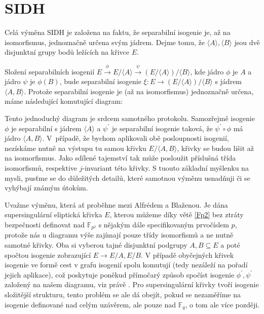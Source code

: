 \documentclass[12pt]{report}
\begin{document}
\section{SIDH}

Celá výměna SIDH je založena na faktu, že separabilní isogenie je, až na isomorfismus, jednoznačně určena svým jádrem. Dejme tomu, že $\langle A \rangle, \langle B \rangle$ jsou dvě disjunktní grupy bodů ležících na křivce $E$.

Složení separabilních isogenií $E \stackrel{\phi}{\longrightarrow} E/\langle A \rangle \stackrel{\psi}{\longrightarrow} (E / \langle A \rangle)/\langle B \rangle$, kde jádro $\phi$ je $A$ a jádro $\psi$ je $\phi (B)$, bude separabilní isogenie $\xi : E \longrightarrow (E / \langle A \rangle)/\langle B \rangle$ s jádrem $\langle A,B \rangle$. Protože separabilní isogenie je (až na isomorfismus) jednoznačně určena, máme následující komutující diagram:

\begin{figure}[h]
\begin{center} 
\end{center}
\end{figure}

Tento jednoduchý diagram je srdcem samotného protokolu. Samozřejmě isogenie $\phi$ je separabilní s jádrem $\langle A \rangle$ a $\psi^\prime$ je separabilní isogenie taková, že $\psi^\prime \circ \phi$ má jádro $\langle A,B \rangle$. V~případě, že bychom aplikovali obě posloupnosti isogenií, nezískáme nutně na výstupu tu samou křivku $E/\langle A,B \rangle$, křivky se budou lišit až na isomorfismus. Jako sdílené tajemství tak může posloužit příslušná třída isomorfismů, respektive $j$-invariant této křivky. S tuouto základní myšlenku na mysli, pusťme se do důležitých detailů, které samotnou výměnu usnadňuji či se vyhýbají známým útokům.

Uvažme výměnu, která ať proběhne mezi Alfrédem a Blaženou. Je dána supersingulární eliptická křivka $E$, kterou můžeme díky větě \ref{Fp2} bez ztráty bezpečnosti definovat nad $\mathbb{F}_{p^2}$ s nějakým dále specifikovaným prvočíslem $p$, protože nás u diagramu výše zajímají pouze třídy isomorfismů a ne nutně samotné křivky. Oba si vyberou tajné disjunktní podgrupy $A,B \subseteq E$ a poté spočtou isogenie zobrazující $E \longrightarrow E/A,E/B$. V případě obyčejných křivek isogenie ve formě cest v grafu isogenií spolu komutují (tedy nezáleží na pořadí jejich aplikace), což poskytuje poněkud přímočarý způsob spočíst isogenie $\phi^\prime,\psi^\prime$ založený na našem diagramu, viz právě \cite{Stolbunov}. Pro supersingulární křivky tvoří isogenie složitější strukturu, tento problém se ale dá obejít, pokud se nezaměříme na isogenie definované nad celým uzávěrem, ale pouze nad $\mathbb{F}_q$, o tom ale více později. 
\end{document}
